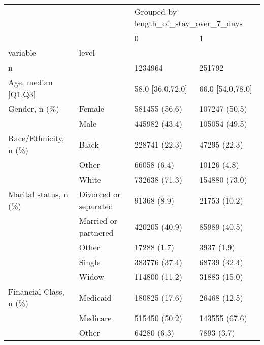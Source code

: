 \begin{tabular}{llll}
\toprule
                                       &   & \multicolumn{2}{l}{Grouped by length\_of\_stay\_over\_7\_days} \\
                                       &   &                                     0 &                 1 \\
variable & level &                                       &                   \\
\midrule
n &   &                               1234964 &            251792 \\
Age, median [Q1,Q3] &   &                      58.0 [36.0,72.0] &  66.0 [54.0,78.0] \\
Gender, n (\%) & Female &                         581455 (56.6) &     107247 (50.5) \\
                                       & Male &                         445982 (43.4) &     105054 (49.5) \\
Race/Ethnicity, n (\%) & Black &                         228741 (22.3) &      47295 (22.3) \\
                                       & Other &                           66058 (6.4) &       10126 (4.8) \\
                                       & White &                         732638 (71.3) &     154880 (73.0) \\
Marital status, n (\%) & Divorced or separated &                           91368 (8.9) &      21753 (10.2) \\
                                       & Married or partnered &                         420205 (40.9) &      85989 (40.5) \\
                                       & Other &                           17288 (1.7) &        3937 (1.9) \\
                                       & Single &                         383776 (37.4) &      68739 (32.4) \\
                                       & Widow &                         114800 (11.2) &      31883 (15.0) \\
Financial Class, n (\%) & Medicaid &                         180825 (17.6) &      26468 (12.5) \\
                                       & Medicare &                         515450 (50.2) &     143555 (67.6) \\
                                       & Other &                           64280 (6.3) &        7893 (3.7) \\

\end{tabular}
